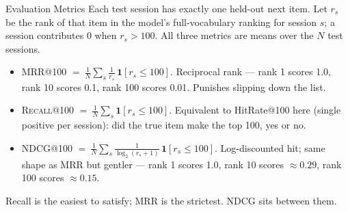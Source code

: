 \documentclass[10pt,aspectratio=169]{beamer}
\newcommand{\metric}[1]{\textsc{#1}}
\begin{document}
\begin{frame}{Evaluation Metrics}
  Each test session has exactly one held-out next item. Let \(r_s\) be the rank of that item in the model's full-vocabulary ranking for session \(s\); a session contributes \(0\) when \(r_s > 100\). All three metrics are means over the \(N\) test sessions.

  \vspace{0.5em}
  \begin{itemize}
    \item \metric{MRR@100} \(=\ \tfrac{1}{N}\sum_{s} \tfrac{1}{r_s}\,\mathbf{1}[r_s \le 100]\). Reciprocal rank --- rank 1 scores 1.0, rank 10 scores 0.1, rank 100 scores 0.01. Punishes slipping down the list.

    \item \metric{Recall@100} \(=\ \tfrac{1}{N}\sum_{s} \mathbf{1}[r_s \le 100]\). Equivalent to HitRate@100 here (single positive per session): did the true item make the top 100, yes or no.

    \item \metric{NDCG@100} \(=\ \tfrac{1}{N}\sum_{s} \tfrac{1}{\log_2(r_s+1)}\,\mathbf{1}[r_s \le 100]\). Log-discounted hit; same shape as MRR but gentler --- rank 1 scores 1.0, rank 10 scores \(\approx 0.29\), rank 100 scores \(\approx 0.15\).
  \end{itemize}

  \vspace{0.4em}
  \footnotesize Recall is the easiest to satisfy; MRR is the strictest. NDCG sits between them.
\end{frame}
\end{document}
